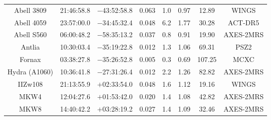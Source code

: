 \begin{table}
\begin{tabular}{cccccccc}
Abell 3809 & 21:46:58.8 & $-$43:52:58.8 & 0.063 & 1.0 & 0.97 & 12.89 & WINGS \\
Abell 4059 & 23:57:00.0 & $-$34:45:32.4 & 0.048 & 6.2 & 1.77 & 30.28 & ACT-DR5 \\
Abell S560 & 06:00:48.2 & $-$58:35:13.2 & 0.037 & 0.8 & 0.91 & 19.90 & AXES-2MRS \\
Antlia & 10:30:03.4 & $-$35:19:22.8 & 0.012 & 1.3 & 1.06 & 69.31 & PSZ2 \\
Fornax & 03:38:27.8 & $-$35:26:52.8 & 0.005 & 0.3 & 0.69 & 107.25 & MCXC \\
Hydra (A1060) & 10:36:41.8 & $-$27:31:26.4 & 0.012 & 2.2 & 1.26 & 82.82 & AXES-2MRS \\
IIZw108 & 21:13:55.9 & $+$02:33:54.0 & 0.048 & 1.6 & 1.12 & 19.16 & WINGS \\
MKW4 & 12:04:27.6 & $+$01:53:42.0 & 0.020 & 1.4 & 1.08 & 42.82 & AXES-2MRS \\
MKW8 & 14:40:42.2 & $+$03:28:19.2 & 0.027 & 1.4 & 1.09 & 32.46 & AXES-2MRS \\
\end{tabular}
\end{table}

